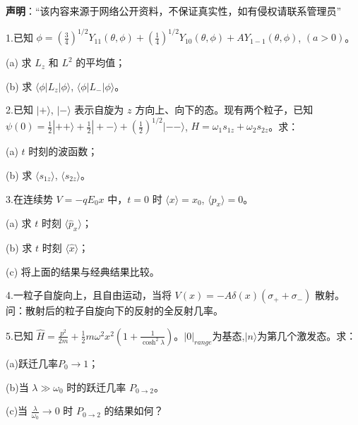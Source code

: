 
\textbf{声明}：“该内容来源于网络公开资料，不保证真实性，如有侵权请联系管理员”

1.已知 $\phi = \left(\frac{3}{4}\right)^{1/2} Y_{11}(\theta, \phi) + \left(\frac{1}{4}\right)^{1/2} Y_{10}(\theta, \phi) + A Y_{1-1}(\theta, \phi)$, $(a > 0)$。

(a) 求 $L_z$ 和 $L^2$ 的平均值；

(b) 求 $\langle \phi | L_z | \phi \rangle$, $\langle \phi | L_- | \phi \rangle$。

2.已知 $|+\rangle$, $|-\rangle$ 表示自旋为 $z$ 方向上、向下的态。现有两个粒子，已知 $\psi(0) = \frac{1}{2} |++\rangle + \frac{1}{2} |+-\rangle + (\frac{1}{2})^{1/2} |--\rangle$, $H = \omega_1 s_{1z} + \omega_2 s_{2z}$。求：

(a) $t$ 时刻的波函数；

(b) 求 $\langle s_{1z} \rangle$, $\langle s_{2z} \rangle$。

3.在连续势 $V = -q E_0 x$ 中，$t = 0$ 时 $\langle x \rangle = x_0$, $\langle p_x \rangle = 0$。

(a) 求 $t$ 时刻 $\langle \hat p_x \rangle$；

(b) 求 $t$ 时刻 $\langle \hat x \rangle$；

(c) 将上面的结果与经典结果比较。

4.一粒子自旋向上，且自由运动，当将 $V(x) = -A \delta(x)(\sigma_+ + \sigma_-)$ 散射。问：散射后的粒子自旋向下的反射的全反射几率。

5.已知 $\hat{H} = \frac{p^2}{2m} + \frac{1}{2} m \omega^2 x^2 \left(1 + \frac{1}{\cosh^2\lambda}\right)$。$|0|_{range}$为基态,$|n\rangle$为第几个激发态。求：

(a)跃迁几率$P_0\to 1$；

(b)当 $\lambda \gg \omega_0$ 时的跃迁几率 $P_{0 \rightarrow 2}$。

(c)当 $\frac{\lambda}{\omega_0} \rightarrow 0$ 时 $P_{0 \rightarrow 2}$ 的结果如何？


